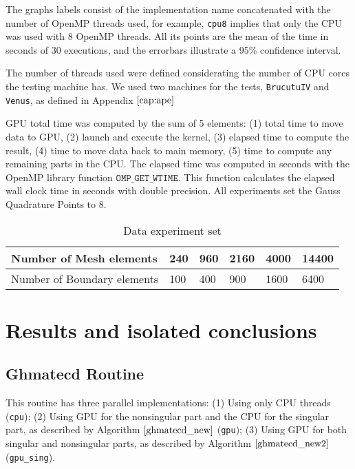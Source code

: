 The graphs labels consist of the implementation name concatenated with the number of OpenMP threads used, 
for example, \texttt{cpu8} implies that only the CPU was used with 8 OpenMP threads. All its points 
are the mean of the time in seconds of 30 executions, and the errorbars illustrate a 95\% confidence interval.

The number of threads used were defined considerating the number of CPU cores the testing machine has. 
We used two machines for the tests, \texttt{BrucutuIV} and \texttt{Venus}, as defined in Appendix $\ref{cap:ape}$

GPU total time was computed by the sum of 5 elements: 
(1) total time to move data to GPU, (2) launch and execute the kernel, (3) elapsed time 
to compute the result, (4) time to move data back to main memory, (5) time to compute 
any remaining parts in the CPU. 
The elapsed time was computed in seconds with the OpenMP library function 
$\texttt{OMP\_GET\_WTIME}$. This function calculates the elapsed wall clock time in seconds 
with double precision. All experiments set the Gauss Quadrature Points to 8.

\begin{table}[]
\centering
\caption{Data experiment set}
\label{experiments}
\begin{tabular}{|l|l|l|l|l|l|}
\hline
Number of Mesh elements     & 240 & 960 & 2160 & 4000 & 14400\\ \hline
Number of Boundary elements & 100 & 400 & 900  & 1600 & 6400\\ \hline
\end{tabular}
\end{table}

\section{Results and isolated conclusions}

\subsection{Ghmatecd Routine}

This routine has three parallel implementations: (1) Using only CPU threads 
(\texttt{cpu}); (2) Using GPU for the nonsingular part and the CPU for the 
singular part, as described by Algorithm $\ref{ghmatecd_new}$ (\texttt{gpu}); 
(3) Using GPU for both singular and nonsingular parts, as described by Algorithm 
$\ref{ghmatecd_new2}$ (\texttt{gpu\_sing}).                                    

